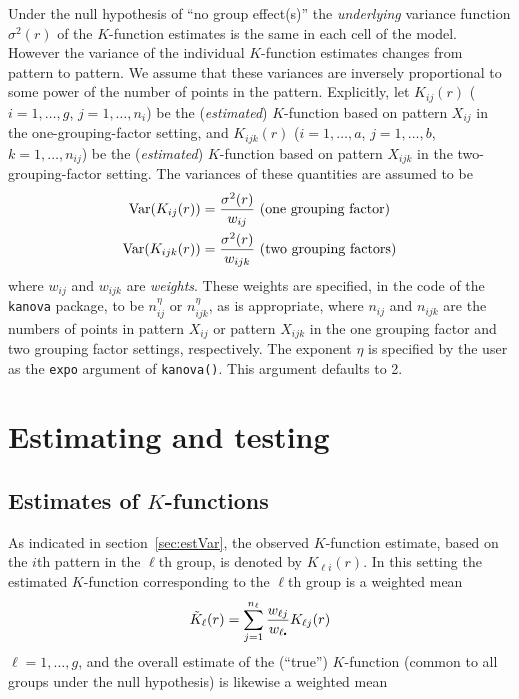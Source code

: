 \documentclass[12pt]{article}
\newcommand{\pullet}{\mbox{\scalebox{0.4}{$\bullet$}}}
\newcommand{\Var}{\mbox{$\textup{\textrm{Var}}$}}
\begin{document}
Under the null hypothesis of ``no group effect(s)'' the
\emph{underlying} variance function $\sigma^2(r)$ of the $K$-function
estimates is the same in each cell of the model.  However the
variance of the individual $K$-function estimates changes from
pattern to pattern.  We assume that these variances are inversely
proportional to some power of the number of points in the pattern.
Explicitly, let $K_{ij}(r)$ ($i=1, \ldots, g$, $j = 1, \ldots, n_i$)
be the (\emph{estimated}) $K$-function based on pattern $X_{ij}$
in the one-grouping-factor setting, and $K_{ijk}(r)$ ($i = 1,
\ldots, a$, $j = 1, \ldots, b$, $k = 1, \ldots, n_{ij}$) be the
(\emph{estimated}) $K$-function based on pattern $X_{ijk}$ in the
two-grouping-factor setting.  The variances of these quantities
are assumed to be
\begin{align*}
\Var(K_{ij}(r)) &= \frac{\sigma^2(r)}{w_{ij}} \mbox{~(one grouping factor)} \\
\Var(K_{ijk}(r)) &= \frac{\sigma^2(r)}{w_{ijk}} \mbox{~(two grouping factors)}
\end{align*}
where $w_{ij}$ and $w_{ijk}$ are \emph{weights}.  These weights are
specified, in the code of the \texttt{kanova} package, to be
$n_{ij}^{\eta}$ or $n_{ijk}^\eta$, as is appropriate, where
$n_{ij}$ and $n_{ijk}$ are the numbers of points in pattern $X_{ij}$
or pattern $X_{ijk}$ in the one grouping factor and two grouping
factor settings, respectively.  The exponent $\eta$ is specified
by the user as the \texttt{expo} argument of \texttt{kanova()}. This
argument defaults to 2.

\section{Estimating and testing}
\label{sec:estAndTest}

\subsection{Estimates of $K$-functions}
\label{sec:estKfns}

As indicated in section~\ref{sec:estVar}, the observed $K$-function
estimate, based on the $i$th pattern in the $\ell$th group,
is denoted by $K_{\ell i}(r)$.  In this setting the estimated
$K$-function corresponding to the $\ell$th group is a weighted mean
\[
\tilde{K}_\ell(r) = \sum_{j=1}^{n_{\ell}}
                   \frac{w_{\ell j}}{w_{\ell \pullet}} K_{\ell j}(r)
\]
$\ell = 1, \ldots, g$, and the overall estimate of the (``true'')
$K$-function (common to all groups under the null hypothesis)
is likewise a weighted mean
\end{document}
